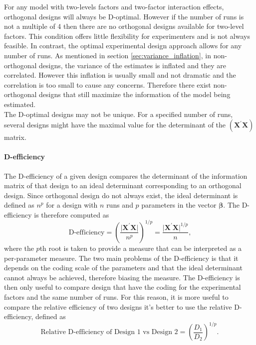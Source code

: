 For any model with two-levels factors and two-factor interaction effects, orthogonal designs will always be D-optimal. However if the number of runs is not a multiple of 4 then there are no orthogonal designs available for two-level factors. This condition offers little flexibility for experimenters and is not always feasible. In contrast, the optimal experimental design approach allows for any number of runs. As mentioned in section \ref{sec:variance_inflation}, in non-orthogonal designs, the variance of the estimates is inflated and they are correlated. However this inflation is usually small and not dramatic and the correlation is too small to cause any concerns. Therefore there exist non-orthogonal designs that still maximize the information of the model being estimated.\\
The D-optimal designs may not be unique. For a specified number of runs, several designs might have the maximal value for the determinant of the $(\mathbf{X}^{\prime}\mathbf{X})$ matrix.\\
\paragraph{D-efficiency}
The D-efficiency of a given design compares the determinant of the information matrix of that design to an ideal determinant corresponding to an orthogonal design. Since orthogonal design do not always exist, the ideal determinant is defined as $n^p$ for a design with $n$ runs and $p$ parameters in the vector $\boldsymbol{\beta}$.  The D-efficiency is therefore computed as
\begin{equation}
    \text{D-efficiency} = \left(\dfrac{\vert\mathbf{X}^{\prime}\mathbf{X}\vert}{n^{p}} \right)^{1/p}=
    \dfrac{\vert\mathbf{X}^{\prime}\mathbf{X}\vert^{1/p}}{n}
    \text{,}
\end{equation}
where the $p$th root is taken to provide a measure that can be interpreted as a per-parameter measure. The two main problems of the D-efficiency is that it depends on the coding scale of the parameters and that the ideal determinant cannot always be achieved, therefore biasing the measure. The D-efficiency is then only useful to compare design that have the coding for the experimental factors and the same number of runs. For this reason, it is more useful to compare the relative efficiency of two designs
it's better to use the relative D-efficiency, defined as
\begin{equation}
    \text{Relative D-efficiency of Design 1 vs Design 2}=
    \left( \dfrac{D_1}{D_2} \right)^{1/p}
    \text{.}
\end{equation}

